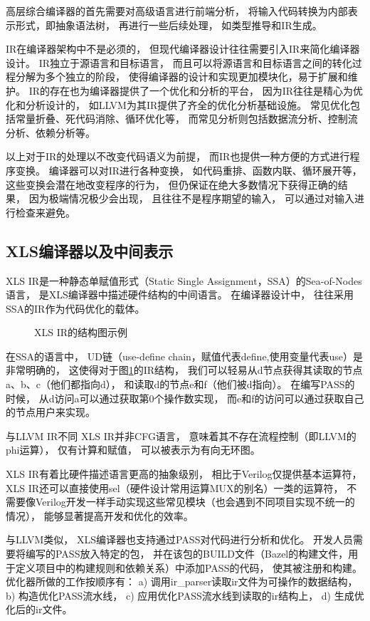 高层综合编译器的首先需要对高级语言进行前端分析，
将输入代码转换为内部表示形式，即抽象语法树，
再进行一些后续处理，
如类型推导和IR生成。

IR在编译器架构中不是必须的，
但现代编译器设计往往需要引入IR来简化编译器设计。
IR独立于源语言和目标语言，
而且可以将源语言和目标语言之间的转化过程分解为多个独立的阶段，
使得编译器的设计和实现更加模块化，易于扩展和维护。
IR的存在也为编译器提供了一个优化和分析的平台，
因为IR往往是精心为优化和分析设计的，
如LLVM为其IR提供了齐全的优化分析基础设施。
常见优化包括常量折叠、死代码消除、循环优化等，
而常见分析则包括数据流分析、控制流分析、依赖分析等。

以上对于IR的处理以不改变代码语义为前提，
而IR也提供一种方便的方式进行程序变换。
编译器可以对IR进行各种变换，
如代码重排、函数内联、循环展开等，
这些变换会潜在地改变程序的行为，
但仍保证在绝大多数情况下获得正确的结果，
因为极端情况极少会出现，
且往往不是程序期望的输入，
可以通过对输入进行检查来避免。

\subsection{XLS编译器以及中间表示}

XLS IR是一种静态单赋值形式（Static Single Assignment，SSA）的Sea-of-Nodes语言，
是XLS编译器中描述硬件结构的中间语言。
在编译器设计中，
往往采用SSA的IR作为代码优化的载体。

\begin{figure}[h]
\centering

\caption{XLS IR的结构图示例}
\label{fig.3}
\end{figure}

在SSA的语言中，
UD链（use-define chain，赋值代表define,使用变量代表use）是非常明确的，
这使得对于图\ref{fig.3}的IR结构，
我们可以轻易从d节点获得其读取的节点a、b、c（他们都指向d），
和读取d的节点e和f（他们被d指向）。
在编写PASS的时候，
从d访问a可以通过获取第0个操作数实现，
而e和f的访问可以通过获取自己的节点用户来实现。

与LLVM IR不同
XLS IR并非CFG语言，
意味着其不存在流程控制（即LLVM的phi运算），
仅有计算和赋值，
可以被表示为有向无环图。

XLS IR有着比硬件描述语言更高的抽象级别，
相比于Verilog仅提供基本运算符，
XLS IR还可以直接使用sel（硬件设计常用运算MUX的别名）一类的运算符，
不需要像Verilog开发一样手动实现这些常见模块（也会遇到不同项目实现不统一的情况），
能够显著提高开发和优化的效率。

与LLVM类似，
XLS编译器也支持通过PASS对代码进行分析和优化。
开发人员需要将编写的PASS放入特定的包，
并在该包的BUILD文件（Bazel的构建文件，用于定义项目中的构建规则和依赖关系）中添加PASS的代码，
使其被注册和构建。
优化器所做的工作按顺序有：
a) 调用ir\_parser读取ir文件为可操作的数据结构，
b) 构造优化PASS流水线，
c) 应用优化PASS流水线到读取的ir结构上，
d) 生成优化后的ir文件。

